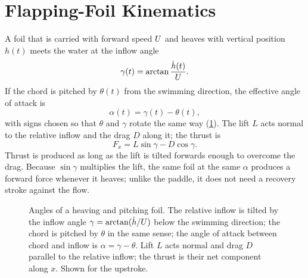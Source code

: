 \section{Flapping-Foil Kinematics}
\label{sec:fund-foil}

A foil that is carried with forward speed $U$ and heaves with vertical position $h(t)$ meets the water at
the inflow angle
\begin{equation}
  \gamma(t) = \arctan\frac{\dot h(t)}{U}.
  \label{eq:gamma}
\end{equation}
If the chord is pitched by $\theta(t)$ from the swimming direction, the effective angle of attack is
\begin{equation}
  \alpha(t) = \gamma(t) - \theta(t),
  \label{eq:alpha}
\end{equation}
with signs chosen so that $\theta$ and $\gamma$ rotate the same way (\cref{fig:foil-sketch}). The lift $L$
acts normal to the relative inflow and the drag $D$ along it; the thrust is
\begin{equation}
  F_x = L\sin\gamma - D\cos\gamma .
  \label{eq:foil-thrust}
\end{equation}
Thrust is produced as long as the lift is tilted forwards enough to overcome the drag. Because $\sin\gamma$
multiplies the lift, the same foil at the same $\alpha$ produces a forward force whenever it heaves; unlike the
paddle, it does not need a recovery stroke against the flow.

\begin{figure}[t]
  \centering
  \caption[Flapping-foil angles]{Angles of a heaving and pitching foil. The relative inflow is tilted by the
    inflow angle $\gamma=\arctan(\dot h/U)$ below the swimming direction; the chord is pitched by $\theta$
    in the same sense; the angle of attack between chord and inflow is $\alpha=\gamma-\theta$. Lift $L$ acts
    normal and drag $D$ parallel to the relative inflow; the thrust is their net component along $x$. Shown
    for the upstroke.}
  \label{fig:foil-sketch}
\end{figure}

